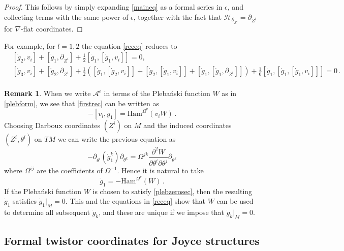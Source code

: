 \documentclass{article}
\theoremstyle{definition}
\newtheorem{remark}[theorem]{Remark}
\numberwithin{equation}{section}
\begin{document}
\begin{proof}
    This follows by simply expanding \eqref{maineq} as a formal series in $\epsilon$, and collecting terms with the same power of $\epsilon$, together with the fact that $\mathcal{H}_{\partial_{Z^i}}=\partial_{Z^i}$ for $\nabla$-flat coordinates.
\end{proof}
For example, for $l=1,2$ the equation \eqref{receq} reduces to
\begin{equation}\label{firstreceq}
\begin{split}
&[\dot{g}_2,v_i]+[\dot{g}_1,\partial_{Z^i}]+\frac{1}{2}[\dot{g}_1,[\dot{g}_1,v_i]]=0,\\
&[\dot{g}_3,v_i]+[\dot{g}_2,\partial_{Z^i}]+\frac{1}{2}\left([\dot{g}_1,[\dot{g}_2,v_i]]+ [\dot{g}_2,[\dot{g}_1,v_i]]+[\dot{g}_1,[\dot{g}_1,\partial_{Z^i}]]\right)+\frac{1}{6}[\dot{g}_1,[\dot{g}_1,[\dot{g}_1,v_i]]]=0\,.\\
\end{split}
\end{equation}
\begin{remark}\label{g1hamrem}
    When we write $\mathcal{A}^{\epsilon}$ in terms of the Pleba\'nski function $W$ as in \eqref{plebform}, we see that \eqref{firstrec} can be written as
    \begin{equation*}
        -[v_i,\dot{g}_1] = \text{Ham}^{\Omega^v}(v_iW)\,.
    \end{equation*}
    Choosing Darboux coordinates $(Z^i)$ on $M$ and the induced coordinates $(Z^i,\theta^i)$ on $TM$ we can write the previous equation as 
    \begin{equation*}
        -\partial_{\theta^i}(\dot{g}_1^k)\partial_{\theta^k}=\Omega^{jk}\frac{\partial^2W}{\partial \theta^i\partial \theta^j}\partial_{\theta^k}
    \end{equation*}
    where $\Omega^{ij}$ are the coefficients of $\Omega^{-1}$. Hence it is natural to take
    \begin{equation}\label{g1pleb}
        \dot{g}_1=-\text{Ham}^{\Omega^v}(W)\,.
    \end{equation}
    If the Pleba\'nski function $W$ is chosen to satisfy \eqref{plebzerosec}, then the resulting $\dot{g}_1$ satisfies $\dot{g}_1|_M=0$. This and the equations in \eqref{receq} show that $W$ can be used to determine all subsequent $\dot{g}_k$, and these are unique if we impose that $\dot{g}_k|_M=0$.
\end{remark}
\subsection{Formal twistor coordinates for Joyce structures}\label{formaldarbouxcoordsec}
\end{document}
